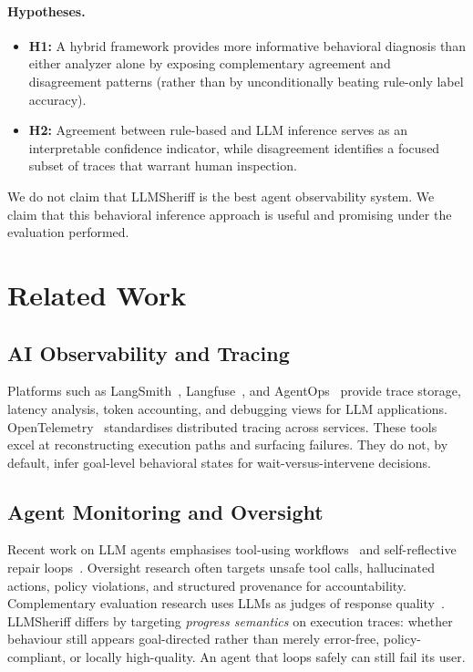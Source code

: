 \documentclass[conference]{IEEEtran}
\begin{document}
\paragraph{Hypotheses.}
\begin{itemize}
\item \textbf{H1:} A hybrid framework provides more informative behavioral diagnosis than
either analyzer alone by exposing complementary agreement and disagreement patterns
(rather than by unconditionally beating rule-only label accuracy).
\item \textbf{H2:} Agreement between rule-based and LLM inference serves as an
interpretable confidence indicator, while disagreement identifies a focused subset of
traces that warrant human inspection.
\end{itemize}

We do not claim that LLMSheriff is the best agent observability system. We claim that this
behavioral inference approach is useful and promising under the evaluation performed.

\section{Related Work}

\subsection{AI Observability and Tracing}

Platforms such as LangSmith~\cite{langsmith}, Langfuse~\cite{langfuse}, and
AgentOps~\cite{agentops} provide trace storage, latency analysis, token accounting, and
debugging views for LLM applications. OpenTelemetry~\cite{otel} standardises distributed
tracing across services. These tools excel at reconstructing execution paths and
surfacing failures. They do not, by default, infer goal-level behavioral states for
wait-versus-intervene decisions.

\subsection{Agent Monitoring and Oversight}

Recent work on LLM agents emphasises tool-using workflows~\cite{yao2023react} and
self-reflective repair loops~\cite{shinn2023reflexion}. Oversight research often targets
unsafe tool calls, hallucinated actions, policy violations, and structured provenance for
accountability. Complementary evaluation research uses LLMs as judges of response
quality~\cite{zheng2023judging}. LLMSheriff differs by targeting \emph{progress
semantics} on execution traces: whether behaviour still appears goal-directed rather than
merely error-free, policy-compliant, or locally high-quality. An agent that loops safely
can still fail its user.
\end{document}
